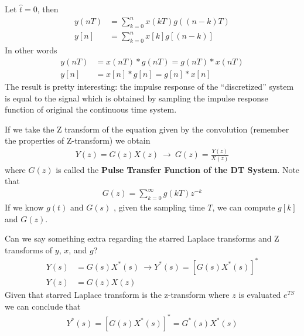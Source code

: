 \documentclass[twoside]{article}
\begin{document}
%
Let $\hat{t} = 0$, then
%
\begin{align*}
y(n T) &= \sum\limits_{k=0}^{n} x(kT) g((n-k) T)
\\
y[n] &= \sum\limits_{k=0}^{n} x[k] g[(n-k)] 
\end{align*}
%
In other words
%
\begin{align*}
y(n T) &= x(nT) \ast g(nT) = g(nT) \ast x(nT)
\\
y[n] &= x[n] \ast g[n] = g[n] \ast x[n]
\end{align*}
% 
The result is pretty interesting: the impulse response of the
``discretized'' system is equal to the signal which is obtained
by sampling the impulse response function of original the 
continuous time system. 

If we take the Z transform of the equation given by the convolution 
(remember the properties of Z-transform) we obtain
%
\begin{align*}
  Y(z) = G(z) X(z) \ \rightarrow \ G(z) = \frac{Y(z)}{X(z)}
\end{align*}
% 
where $G(z)$ is called the \textbf{Pulse Transfer Function of the DT
  System}. Note that 
%
\begin{align*}
  G(z) = \sum\limits_{k=0}^{\infty} g(kT) z^{-k}
\end{align*}
%
If we know $g(t)$ and $G(s)$ , given the sampling time $T$, we can compute 
$g[k]$ and $G(z)$. 

Can we say something extra regarding the starred Laplace transforms
and Z transforms of $y$, $x$, and $g$?
%
\begin{align*}
  Y(s) &= G(s) X^*(s) \ \rightarrow Y^*(s) = \left[ G(s) X^*(s)
  \right]^*
\\
Y(z) &= G(z) X(z)
\end{align*}
%
Given that starred Laplace transform is the z-transform where $z$ is evaluated 
$e^{TS}$ we can conclude that
%
\begin{align*}
Y^*(s) = \left[ G(s) X^*(s) \right]^* = G^*(s) X^*(s)
\end{align*}
%

\end{document}
